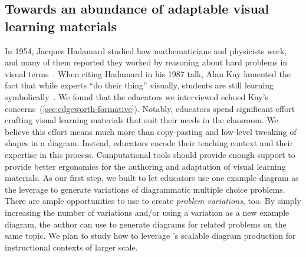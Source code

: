 \subsection{Towards an abundance of adaptable visual learning materials}

In 1954, Jacques Hadamard studied how mathematicians and physicists work, and many of them reported they worked by reasoning about hard problems in visual terms~\mbox{\cite{Hadamard1997a}}. When citing Hadamard in his 1987 talk, Alan Kay lamented the fact that while experts ``do their thing'' visually, students are still learning symbolically~\cite{doingWithImages}. We found that the educators we interviewed echoed Kay's concerns~(\cref{sec:edgeworth-formative}). Notably, educators spend significant effort crafting visual learning materials that suit their needs in the classroom. We believe this effort means much more than copy-pasting and low-level tweaking of shapes in a diagram. Instead, educators encode their teaching context and their expertise in this process. Computational tools should provide enough support to provide better ergonomics for the authoring and adaptation of visual learning materials. As our first step, we built \Edgeworth to let educators use one example diagram as the leverage to generate variations of diagrammatic multiple choice problems. There are ample opportunities to use \Edgeworth to create \textit{problem variations}, too. By simply increasing the number of variations and/or using a variation as a new example diagram, the author can use \Edgeworth to generate diagrams for related problems on the same topic. We plan to study how to leverage \Edgeworth's scalable diagram production for instructional contexts of larger scale.
